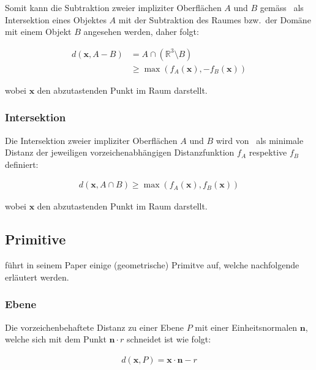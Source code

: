 Somit kann die Subtraktion zweier impliziter Oberflächen $A$ und $B$
gemäss~\cite{hart_sphere_1994} als Intersektion eines Objektes $A$ mit der
Subtraktion des Raumes bzw.\ der Domäne mit einem Objekt $B$ angesehen werden,
daher folgt:

\begin{align}
    d(\bm{x}, A - B) &= A \cap (\mathbb{R}^{3} \setminus B) \\
                     &\geq \max(f_{A}(\bm{x}), -f_{B}(\bm{x}))
\end{align}

wobei $\bm{x}$ den abzutastenden Punkt im Raum darstellt.

\subsubsection{Intersektion}
\label{ssubsec:implicit_surfaces_ops_intersection}

Die Intersektion zweier impliziter Oberflächen $A$ und $B$ wird
von~\cite{hart_sphere_1994} als minimale Distanz der jeweiligen
vorzeichenabhängigen  Distanzfunktion $f_{A}$ respektive $f_{B}$ definiert:

\begin{gather}
    d(\bm{x}, A \cap B) \geq \max(f_{A}(\bm{x}), f_{B}(\bm{x}))
\end{gather}

wobei $\bm{x}$ den abzutastenden Punkt im Raum darstellt.

\subsection{Primitive}
\label{subsec:implicit_surfaces_primitives}

\cite{hart_sphere_1994} führt in seinem Paper einige (geometrische) Primitve
auf, welche nachfolgende erläutert werden.

\subsubsection{Ebene}
\label{ssubsec:implicit_surfaces_primitives_plane}

Die vorzeichenbehaftete Distanz zu einer Ebene $P$ mit einer Einheitsnormalen $\bm{n}$, welche sich mit dem Punkt $\bm{n} \cdot r$ schneidet ist wie folgt:

\begin{gather}
    d(\bm{x}, P) = \bm{x} \cdot \bm{n} - r
\end{gather}

